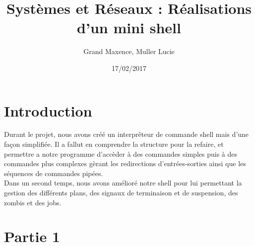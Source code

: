 \documentclass{report}
\author{Grand Maxence, Muller Lucie}
\title{Syst\`emes et R\'eseaux  : R\'ealisations d'un mini shell}
\date{17/02/2017}
\begin{document}
	
	\maketitle
	\tableofcontents

	\chapter*{Introduction}
		Durant le projet, nous avons cr\'e\'e un interpr\^eteur de commande shell mais d'une fa\c{c}on simplifi\'ee. Il a fallut en comprendre la structure pour la refaire, et permettre a notre programme d'acc\`eder \`a des commandes simples puis \`a des commandes plus complexes g\`erant les redirections d'entr\'ees-sorties ainsi que les s\'equences de commandes pip\'ees.\\
		Dans un second temps, nous avons am\'elior\'e notre shell pour lui permettant la gestion des diff\'erents plans, des signaux de terminaison et de suspension, des zombis et des jobs.
	\chapter{Partie 1}
\end{document}
